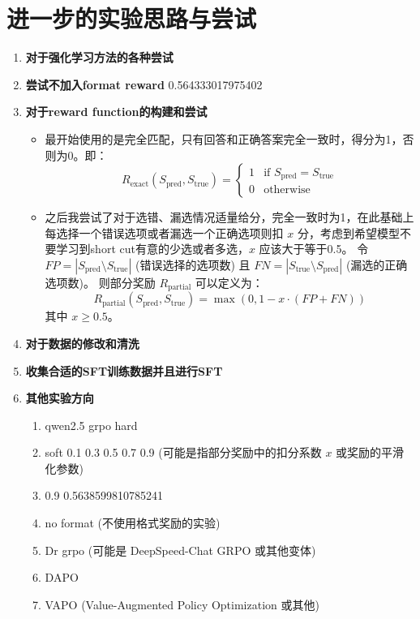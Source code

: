 \documentclass{pkuthesis}
\begin{document}
\section{进一步的实验思路与尝试}
\begin{enumerate}[label=\arabic*.]
    \item \textbf{对于强化学习方法的各种尝试}
    \item \textbf{尝试不加入format reward}
    0.564333017975402
    \item \textbf{对于reward function的构建和尝试}
    \begin{itemize}
        \item 最开始使用的是完全匹配，只有回答和正确答案完全一致时，得分为1，否则为0。即：
        $$ R_{\text{exact}}(S_{\text{pred}}, S_{\text{true}}) = \begin{cases} 1 & \text{if } S_{\text{pred}} = S_{\text{true}} \\ 0 & \text{otherwise} \end{cases} $$
        \item 之后我尝试了对于选错、漏选情况适量给分，完全一致时为1，在此基础上每选择一个错误选项或者漏选一个正确选项则扣 $x$ 分，考虑到希望模型不要学习到short cut有意的少选或者多选，$x$ 应该大于等于0.5。
        令 $FP = |S_{\text{pred}} \setminus S_{\text{true}}|$ (错误选择的选项数) 且 $FN = |S_{\text{true}} \setminus S_{\text{pred}}|$ (漏选的正确选项数)。
        则部分奖励 $R_{\text{partial}}$ 可以定义为：
        $$ R_{\text{partial}}(S_{\text{pred}}, S_{\text{true}}) = \max(0, 1 - x \cdot (FP + FN)) $$
        其中 $x \ge 0.5$。
    \end{itemize}
    \item \textbf{对于数据的修改和清洗}
    \item \textbf{收集合适的SFT训练数据并且进行SFT}
    \item \textbf{其他实验方向}
    \begin{enumerate}[label=\arabic*.]
        \item qwen2.5 grpo hard
        \item soft 0.1 0.3 0.5 0.7 0.9 (可能是指部分奖励中的扣分系数 $x$ 或奖励的平滑化参数)
        \item 0.9 0.5638599810785241
        \item no format (不使用格式奖励的实验)
        \item Dr grpo (可能是 DeepSpeed-Chat GRPO 或其他变体)
        \item DAPO
        \item VAPO (Value-Augmented Policy Optimization 或其他)

\end{enumerate}
\end{enumerate}
\end{document}
